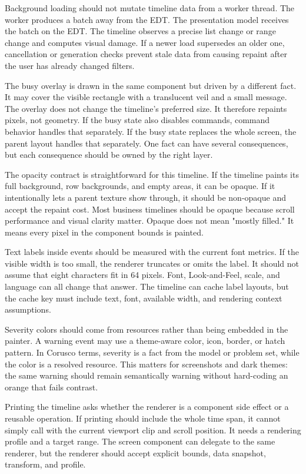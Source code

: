 Background loading should not mutate timeline data from a worker thread. The worker produces a batch away from the EDT. The presentation model receives the batch on the EDT. The timeline observes a precise list change or range change and computes visual damage. If a newer load supersedes an older one, cancellation or generation checks prevent stale data from causing repaint after the user has already changed filters.

The busy overlay is drawn in the same component but driven by a different fact. It may cover the visible rectangle with a translucent veil and a small message. The overlay does not change the timeline's preferred size. It therefore repaints pixels, not geometry. If the busy state also disables commands, command behavior handles that separately. If the busy state replaces the whole screen, the parent layout handles that separately. One fact can have several consequences, but each consequence should be owned by the right layer.

The opacity contract is straightforward for this timeline. If the timeline paints its full background, row backgrounds, and empty areas, it can be opaque. If it intentionally lets a parent texture show through, it should be non-opaque and accept the repaint cost. Most business timelines should be opaque because scroll performance and visual clarity matter. Opaque does not mean "mostly filled." It means every pixel in the component bounds is painted.

Text labels inside events should be measured with the current font metrics. If the visible width is too small, the renderer truncates or omits the label. It should not assume that eight characters fit in 64 pixels. Font, Look-and-Feel, scale, and language can all change that answer. The timeline can cache label layouts, but the cache key must include text, font, available width, and rendering context assumptions.

Severity colors should come from resources rather than being embedded in the painter. A warning event may use a theme-aware color, icon, border, or hatch pattern. In Corusco terms, severity is a fact from the model or problem set, while the color is a resolved resource. This matters for screenshots and dark themes: the same warning should remain semantically warning without hard-coding an orange that fails contrast.

Printing the timeline asks whether the renderer is a component side effect or a reusable operation. If printing should include the whole time span, it cannot simply call  with the current viewport clip and scroll position. It needs a rendering profile and a target range. The screen component can delegate to the same renderer, but the renderer should accept explicit bounds, data snapshot, transform, and profile.

